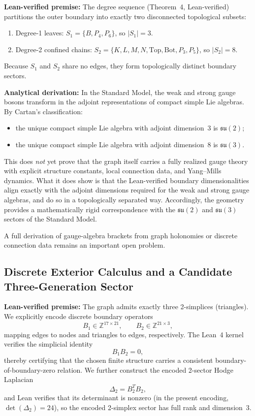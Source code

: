 \documentclass[12pt, a4paper]{article}
\begin{document}
\noindent\textbf{Lean-verified premise:} The degree sequence (Theorem~4, Lean-verified) partitions the outer boundary into exactly two disconnected topological subsets:
\begin{enumerate}
    \item Degree-1 leaves: $S_1 = \{B, P_4, P_6\}$, so $|S_1| = 3$.
    \item Degree-2 confined chains: $S_2 = \{K, L, M, N, \text{Top}, \text{Bot}, P_3, P_5\}$, so $|S_2| = 8$.
\end{enumerate}
Because $S_1$ and $S_2$ share no edges, they form topologically distinct boundary sectors.

\medskip

\noindent\textbf{Analytical derivation:} In the Standard Model, the weak and strong gauge bosons transform in the adjoint representations of compact simple Lie algebras. By Cartan's classification:
\begin{itemize}
    \item the unique compact simple Lie algebra with adjoint dimension~3 is $\mathfrak{su}(2)$;
    \item the unique compact simple Lie algebra with adjoint dimension~8 is $\mathfrak{su}(3)$.
\end{itemize}

This does \emph{not} yet prove that the graph itself carries a fully realized gauge theory with explicit structure constants, local connection data, and Yang--Mills dynamics. What it does show is that the Lean-verified boundary dimensionalities align exactly with the adjoint dimensions required for the weak and strong gauge algebras, and do so in a topologically separated way. Accordingly, the geometry provides a mathematically rigid correspondence with the $\mathfrak{su}(2)$ and $\mathfrak{su}(3)$ sectors of the Standard Model.

A full derivation of gauge-algebra brackets from graph holonomies or discrete connection data remains an important open problem.

\subsection{Discrete Exterior Calculus and a Candidate Three-Generation Sector}

\noindent\textbf{Lean-verified premise:} The graph admits exactly three 2-simplices (triangles). We explicitly encode discrete boundary operators
\[
B_1 \in \mathbb{Z}^{17 \times 21},
\qquad
B_2 \in \mathbb{Z}^{21 \times 3},
\]
mapping edges to nodes and triangles to edges, respectively. The Lean~4 kernel verifies the simplicial identity
\[
B_1 B_2 = 0,
\]
thereby certifying that the chosen finite structure carries a consistent boundary-of-boundary-zero relation. We further construct the encoded 2-sector Hodge Laplacian
\[
\Delta_2 = B_2^T B_2,
\]
and Lean verifies that its determinant is nonzero (in the present encoding, $\det(\Delta_2)=24$), so the encoded 2-simplex sector has full rank and dimension~3.
\end{document}
